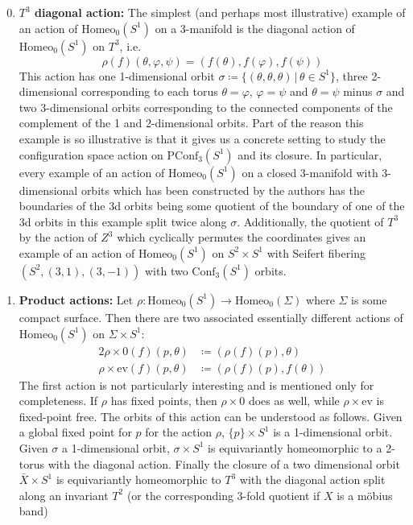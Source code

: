 \documentclass[10pt, oneside]{article}
\newcommand{\homeo}[1][S^1]{\text{Homeo}_0(#1)}
\newcommand{\conf}[2][S^1]{\text{Conf}_{#2}(#1)}
\newcommand{\pconf}[2][S^1]{\text{PConf}_{#2}(#1)}
\theoremstyle{definition}
\theoremstyle{definition}
\begin{document}
\begin{enumerate}
    \setcounter{enumi}{-1}
    \item {\bf $T^3$ diagonal action:} The simplest (and perhaps most illustrative) example of an action of $\homeo$ on a 3-manifold is the diagonal action of $\homeo$ on $T^3$, i.e.$$\rho(f)(\theta, \varphi, \psi) = (f(\theta), f(\varphi), f(\psi))$$ This action has one 1-dimensional orbit $\sigma \coloneqq \{(\theta,\theta,\theta)\,\vert\,\theta\in S^1\}$, three 2-dimensional corresponding to each torus $\theta=\varphi$, $\varphi=\psi$ and $\theta=\psi$ minus $\sigma$ and two 3-dimensional orbits corresponding to the connected components of the complement of the 1 and 2-dimensional orbits. Part of the reason this example is so illustrative is that it gives us a concrete setting to study the configuration space action on $\pconf{3}$ and its closure. In particular, every example of an action of $\homeo$ on a closed 3-manifold with 3-dimensional orbits which has been constructed by the authors has the boundaries of the 3d orbits being some quotient of the boundary of one of the 3d orbits in this example split twice along $\sigma$. Additionally, the quotient of $T^3$ by the action of $Z^3$ which cyclically permutes the coordinates gives an example of an action of $\homeo$ on $S^2\times S^1$ with Seifert fibering $(S^2, (3, 1), (3, -1))$ with two $\conf{3}$ orbits.


    \item {\bf Product actions:} Let $\rho:\homeo[S^1]\to\homeo[\Sigma]$ where $\Sigma$ is some compact surface. Then there are two associated essentially different actions of $\homeo[S^1]$ on $\Sigma\times S^1$:
    \begin{alignat*}{2}
        \rho\times 0(f)(p, \theta) &\coloneqq (\rho(f)(p), \theta) \\
        \rho\times \text{ev}(f)(p, \theta) &\coloneqq (\rho(f)(p), f(\theta))
    \end{alignat*}
    The first action is not particularly interesting and is mentioned only for completeness. If $\rho$ has fixed points, then $\rho\times 0$ does as well, while $\rho\times \text{ev}$ is fixed-point free. The orbits of this action can be understood as follows. Given a global fixed point for $p$ for the action $\rho$, $\{p\}\times S^1$ is a 1-dimensional orbit. Given $\sigma$ a 1-dimensional orbit, $\sigma\times S^1$ is equivariantly homeomorphic to a 2-torus with the diagonal action. Finally the closure of a two dimensional orbit $\bar{X}\times S^1$ is equivariantly homeomorphic to $T^3$ with the diagonal action split along an invariant $T^2$ (or the corresponding 3-fold quotient if $X$ is a m\"{o}bius band)
\end{enumerate}
\end{document}
